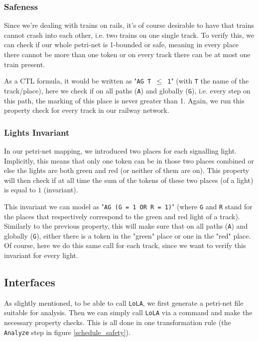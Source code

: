 \documentclass{article}
\begin{document}
\subsubsection{Safeness}

Since we're dealing with trains on rails, it's of course desirable to have that trains cannot crash into each other, i.e. two trains on one single track. To verify this, we can check if our whole petri-net is 1-bounded or safe, meaning in every place there cannot be more than one token or on every track there can be at most one train present.

As a CTL formula, it would be written as "\texttt{AG T $\leq$ 1}" (with \texttt{T} the name of the track/place), here we check if on all paths (\texttt{A}) and globally (\texttt{G}), i.e. every step on this path, the marking of this place is never greater than 1. Again, we run this property check for every track in our railway network.

\subsubsection{Lights Invariant}

In our petri-net mapping, we introduced two places for each signalling light. Implicitly, this means that only one token can be in those two places combined or else the lights are both green and red (or neither of them are on). This property will then check if at all time the sum of the tokens of these two places (of a light) is equal to $1$ (invariant).

This invariant we can model as "\texttt{AG (G = 1 OR R = 1)}" (where \texttt{G} and \texttt{R} stand for the places that respectively correspond to the green and red light of a track). Similarly to the previous property, this will make sure that on all paths (\texttt{A}) and globally (\texttt{G}), either there is a token in the "green" place or one in the "red" place. Of course, here we do this same call for each track, since we want to verify this invariant for every light.

\subsection{Interfaces}
\label{safety_interfaces}

As slightly mentioned, to be able to call \texttt{LoLA}, we first generate a petri-net file suitable for analysis. Then we can simply call \texttt{LoLA} via a command and make the necessary property checks. This is all done in one transformation rule (the \texttt{Analyze} step in figure \ref{schedule_safety}).
\end{document}

